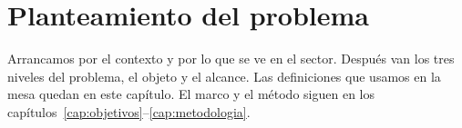 \chapter{Planteamiento del problema}

Arrancamos por el contexto y por lo que se ve en el sector. Después van los tres niveles del
problema, el objeto y el alcance. Las definiciones que usamos en la mesa quedan en este capítulo.
El marco y el método siguen en los capítulos~\ref{cap:objetivos}--\ref{cap:metodologia}.










